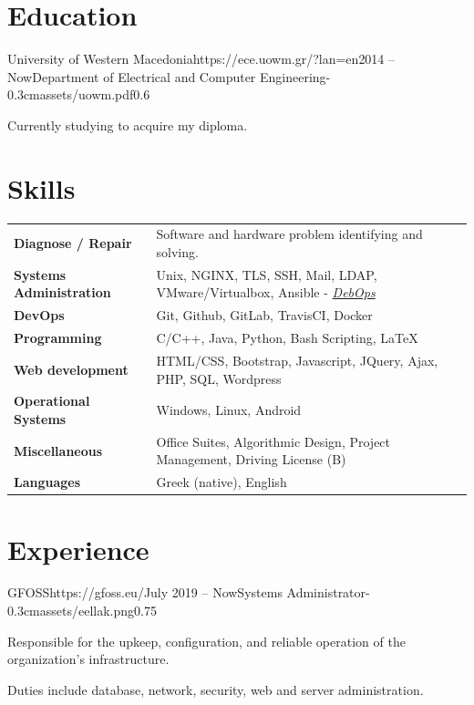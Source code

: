 \documentclass{mycv}
\begin{document}
	\section{Education}
	
	\begin{EntryDatedLogo}{University of Western Macedonia}{https://ece.uowm.gr/?lan=en}{2014 -- Now}{Department of Electrical and Computer Engineering}{-0.3cm}{assets/uowm.pdf}{0.6}
	\begin{Itemize}
		\item Currently studying to acquire my diploma.
	\end{Itemize}
	\end{EntryDatedLogo}

	\section{Skills}
	\begin{tabular}{m{4.5cm} m{13cm}}
		\textbf{Diagnose / Repair}     	& Software and hardware problem identifying and solving. \\
		\textbf{Systems Administration}	& Unix, NGINX, TLS, SSH, Mail, LDAP, VMware/Virtualbox, Ansible - \href{https://debops.org}{\textit{DebOps}} \\
		\textbf{DevOps}	                & Git, Github, GitLab, TravisCI, Docker \\
		\textbf{Programming} 	 	   	& C/C++, Java, Python, Bash Scripting, \LaTeX \\
		\textbf{Web development}	   	& HTML/CSS, Bootstrap, Javascript, JQuery, Ajax, PHP, SQL, Wordpress \\
		\textbf{Operational Systems}   	& Windows, Linux, Android \\
		\textbf{Miscellaneous}         	& Office Suites, Algorithmic Design, Project Management, Driving License (B) \\
		\textbf{Languages} 			   	& Greek (native), English 
	\end{tabular}

	\section{Experience}
	
	\begin{EntryDatedLogo}{GFOSS}{https://gfoss.eu/}{July 2019 -- Now}{Systems Administrator}{-0.3cm}{assets/eellak.png}{0.75}
		\begin{Itemize}
			\item Responsible for the upkeep, configuration, and reliable operation of the organization's infrastructure. \item Duties include database, network, security, web and server administration.
		\end{Itemize}
	\end{EntryDatedLogo}
\end{document}
